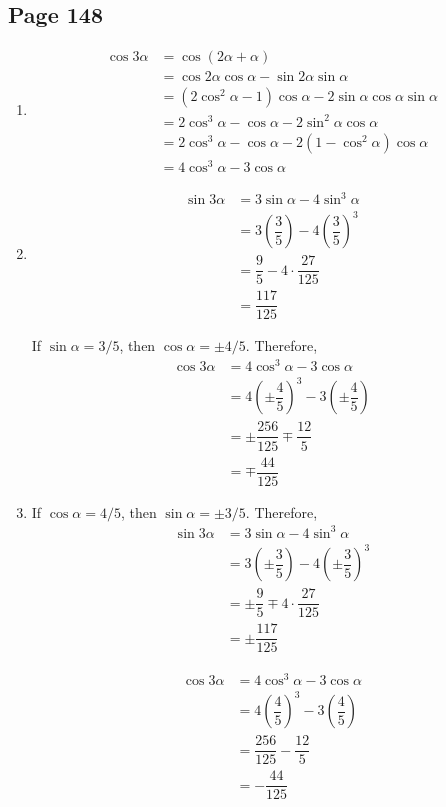 \documentclass{article}
\newenvironment{solutions}[1]
{\subsection*{#1}
 \begin{enumerate}[leftmargin=1.5em]}
{\end{enumerate}}
\newcommand{\solution}{\item}
\begin{document}
\begin{solutions}{Page 148}
\solution %
\begin{align*}
\cos{3\alpha} &= \cos\left(2\alpha+\alpha\right) \\
&= \cos{2\alpha}\cos{\alpha} - \sin{2\alpha}\sin{\alpha} \\
&= \left(2\cos^{2}{\alpha}-1\right)\cos{\alpha} - 2\sin{\alpha}\cos{\alpha}\sin{\alpha} \\
&= 2\cos^{3}{\alpha}-\cos{\alpha}-2\sin^{2}{\alpha}\cos{\alpha} \\
&= 2\cos^{3}{\alpha}-\cos{\alpha}-2\left(1-\cos^{2}{\alpha}\right)\cos{\alpha} \\
&= 4\cos^{3}{\alpha} - 3\cos{\alpha}
\end{align*}

\solution %
\begin{align*}
\sin{3\alpha} &= 3\sin{\alpha}-4\sin^{3}{\alpha} \\
&= 3\left(\dfrac{3}{5}\right)-4\left(\dfrac{3}{5}\right)^3 \\
&= \dfrac{9}{5} - 4 \cdot \dfrac{27}{125} \\
&= \dfrac{117}{125}
\end{align*}

If $\sin{\alpha}=3/5$, then $\cos{\alpha}=\pm 4/5$. Therefore,
\begin{align*}
\cos{3\alpha} &= 4\cos^{3}{\alpha}-3\cos{\alpha} \\
&= 4\left(\pm \dfrac{4}{5}\right)^3 - 3\left(\pm \dfrac{4}{5}\right) \\
&= \pm \dfrac{256}{125} \mp \dfrac{12}{5} \\
&= \mp \dfrac{44}{125}
\end{align*}

\solution %
If $\cos{\alpha}=4/5$, then $\sin{\alpha}=\pm 3/5$. Therefore,
\begin{align*}
\sin{3\alpha} &= 3\sin{\alpha}-4\sin^{3}{\alpha} \\
&= 3\left(\pm \dfrac{3}{5}\right)-4\left(\pm \dfrac{3}{5}\right)^3 \\
&= \pm \dfrac{9}{5} \mp 4 \cdot \dfrac{27}{125} \\
&= \pm \dfrac{117}{125}
\end{align*}

\begin{align*}
\cos{3\alpha} &= 4\cos^{3}{\alpha}-3\cos{\alpha} \\
&= 4\left(\dfrac{4}{5}\right)^3 - 3\left(\dfrac{4}{5}\right) \\
&= \dfrac{256}{125} - \dfrac{12}{5} \\
&= -\dfrac{44}{125}
\end{align*}


\end{solutions}
\end{document}
